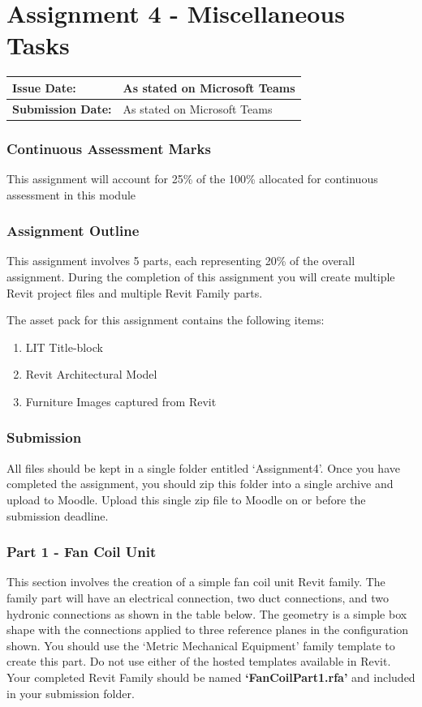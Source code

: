 
	
\part*{Assignment 4 - Miscellaneous Tasks}

\begin{tabularx}{\textwidth}{ |X|X| }
	\hline
	\textbf{Issue Date:} & As stated on Microsoft Teams\\
	\hline 
	\textbf{Submission Date:}  & As stated on Microsoft Teams\\
	\hline
\end{tabularx}

\section*{Continuous Assessment Marks}
This assignment will account for 25\% of the 100\% allocated for continuous assessment in this module

\section*{Assignment Outline}
This assignment involves 5 parts, each representing 20\% of the overall assignment. During the completion of this assignment you will create multiple Revit project files and multiple Revit Family parts.


The asset pack for this assignment contains the following items:
\begin{enumerate}
	\item LIT Title-block
	\item Revit Architectural Model
	\item Furniture Images captured from Revit
\end{enumerate}


\section*{Submission}
All files should be kept in a single folder entitled ‘Assignment4’. Once you have completed the assignment, you should zip this folder into a single archive and upload to Moodle. Upload this single zip file to Moodle on or before the submission deadline.


\newpage

\section*{Part 1 - Fan Coil Unit}
This section involves the creation of a simple fan coil unit Revit family. The family part will have an electrical connection, two duct connections, and two hydronic connections as shown in the table below. The geometry is a simple box shape with the connections applied to three reference planes in the configuration shown. You should use the ‘Metric Mechanical Equipment’ family template to create this part. Do not use either of the hosted templates available in Revit.  Your completed Revit Family should be named \textbf{‘FanCoilPart1.rfa’} and included in your submission folder.\\

